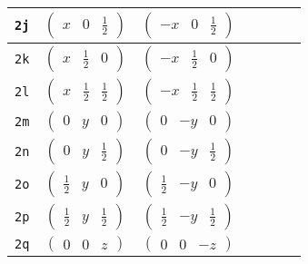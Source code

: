 \documentclass[fleqn,9pt,landscape]{jsarticle}
\begin{document}
\begin{center}
\begin{longtable}{ccccccc}
{\tt 2j} & $ \begin{pmatrix} x & 0 & \frac{1}{2} \end{pmatrix} $ & $ \begin{pmatrix} - x & 0 & \frac{1}{2} \end{pmatrix} $ & $  $ & $  $ \\ \hline
{\tt 2k} & $ \begin{pmatrix} x & \frac{1}{2} & 0 \end{pmatrix} $ & $ \begin{pmatrix} - x & \frac{1}{2} & 0 \end{pmatrix} $ & $  $ & $  $ \\ \hline
{\tt 2l} & $ \begin{pmatrix} x & \frac{1}{2} & \frac{1}{2} \end{pmatrix} $ & $ \begin{pmatrix} - x & \frac{1}{2} & \frac{1}{2} \end{pmatrix} $ & $  $ & $  $ \\ \hline
{\tt 2m} & $ \begin{pmatrix} 0 & y & 0 \end{pmatrix} $ & $ \begin{pmatrix} 0 & - y & 0 \end{pmatrix} $ & $  $ & $  $ \\ \hline
{\tt 2n} & $ \begin{pmatrix} 0 & y & \frac{1}{2} \end{pmatrix} $ & $ \begin{pmatrix} 0 & - y & \frac{1}{2} \end{pmatrix} $ & $  $ & $  $ \\ \hline
{\tt 2o} & $ \begin{pmatrix} \frac{1}{2} & y & 0 \end{pmatrix} $ & $ \begin{pmatrix} \frac{1}{2} & - y & 0 \end{pmatrix} $ & $  $ & $  $ \\ \hline
{\tt 2p} & $ \begin{pmatrix} \frac{1}{2} & y & \frac{1}{2} \end{pmatrix} $ & $ \begin{pmatrix} \frac{1}{2} & - y & \frac{1}{2} \end{pmatrix} $ & $  $ & $  $ \\ \hline
{\tt 2q} & $ \begin{pmatrix} 0 & 0 & z \end{pmatrix} $ & $ \begin{pmatrix} 0 & 0 & - z \end{pmatrix} $ & $  $ & $  $ \\ \hline

\end{longtable}
\end{center}
\end{document}
